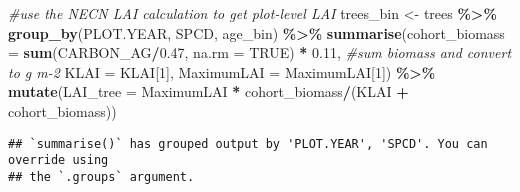 \documentclass[
]{article}
\newenvironment{Shaded}{\begin{snugshade}}{\end{snugshade}}
\newcommand{\AttributeTok}[1]{\textcolor[rgb]{0.13,0.29,0.53}{#1}}
\newcommand{\CommentTok}[1]{\textcolor[rgb]{0.56,0.35,0.01}{\textit{#1}}}
\newcommand{\ConstantTok}[1]{\textcolor[rgb]{0.56,0.35,0.01}{#1}}
\newcommand{\DecValTok}[1]{\textcolor[rgb]{0.00,0.00,0.81}{#1}}
\newcommand{\FloatTok}[1]{\textcolor[rgb]{0.00,0.00,0.81}{#1}}
\newcommand{\FunctionTok}[1]{\textcolor[rgb]{0.13,0.29,0.53}{\textbf{#1}}}
\newcommand{\NormalTok}[1]{#1}
\newcommand{\OtherTok}[1]{\textcolor[rgb]{0.56,0.35,0.01}{#1}}
\newcommand{\SpecialCharTok}[1]{\textcolor[rgb]{0.81,0.36,0.00}{\textbf{#1}}}
\begin{document}
\begin{Shaded}
\begin{Highlighting}[]
\CommentTok{\#use the NECN LAI calculation to get plot{-}level LAI}
\NormalTok{trees\_bin }\OtherTok{\textless{}{-}}\NormalTok{ trees }\SpecialCharTok{\%\textgreater{}\%}
  \FunctionTok{group\_by}\NormalTok{(PLOT.YEAR, SPCD, age\_bin) }\SpecialCharTok{\%\textgreater{}\%}
  \FunctionTok{summarise}\NormalTok{(}\AttributeTok{cohort\_biomass =} \FunctionTok{sum}\NormalTok{(CARBON\_AG}\SpecialCharTok{/}\FloatTok{0.47}\NormalTok{, }\AttributeTok{na.rm =} \ConstantTok{TRUE}\NormalTok{) }\SpecialCharTok{*} \FloatTok{0.11}\NormalTok{, }\CommentTok{\#sum biomass and convert to g m{-}2}
            \AttributeTok{KLAI =}\NormalTok{ KLAI[}\DecValTok{1}\NormalTok{],}
            \AttributeTok{MaximumLAI =}\NormalTok{ MaximumLAI[}\DecValTok{1}\NormalTok{]) }\SpecialCharTok{\%\textgreater{}\%}
  \FunctionTok{mutate}\NormalTok{(}\AttributeTok{LAI\_tree =}\NormalTok{ MaximumLAI }\SpecialCharTok{*}\NormalTok{ cohort\_biomass}\SpecialCharTok{/}\NormalTok{(KLAI }\SpecialCharTok{+}\NormalTok{ cohort\_biomass))}
\end{Highlighting}
\end{Shaded}

\begin{verbatim}
## `summarise()` has grouped output by 'PLOT.YEAR', 'SPCD'. You can override using
## the `.groups` argument.
\end{verbatim}

\begin{Shaded}
\end{Shaded}
\end{document}
